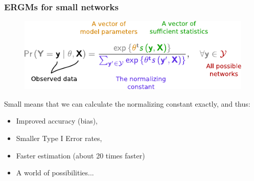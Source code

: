 \documentclass[aspectratio=169, 9pt]{beamer}\usepackage[]{graphicx}\usepackage[]{color}
\begin{document}
\begin{frame}[label=ergm-vs-ergmito]
\frametitle{ERGMs for small networks}


\begin{figure}
\centering
\includegraphics[width=.5\linewidth]{parts-of-ergm.pdf}
\end{figure}\pause{}

Small means that we can calculate the normalizing constant exactly, and thus:\pause{}

\begin{itemize}[<+->]
\item Improved accuracy (bias),
\item Smaller Type I Error rates,
\item Faster estimation (about 20 times faster)
\item A world of possibilities...
\end{itemize}


\vfill


\end{frame}
\end{document}
